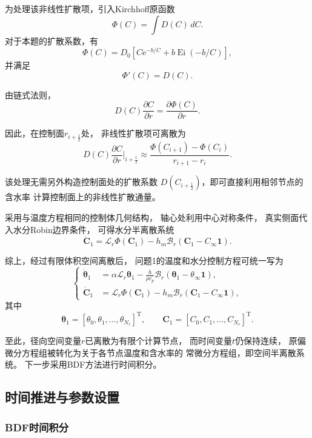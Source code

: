 \documentclass[withoutpreface]{cumcmthesis}
\begin{document}
\begin{enumerate}[label=(\arabic*)]
为处理该非线性扩散项，引入Kirchhoff原函数
\[
\Phi(C)
=
\int D(C)\,dC.
\]
对于本题的扩散系数，有
\[
\Phi(C)
=
D_0
\left[
C\mathrm e^{-b/C}
+
b\operatorname{Ei}(-b/C)
\right],
\]
并满足
\[
\Phi'(C)=D(C).
\]

由链式法则，
\[
D(C)\frac{\partial C}{\partial r}
=
\frac{\partial\Phi(C)}{\partial r}.
\]

因此，在控制面$r_{i+\frac12}$处，
非线性扩散项可离散为
\[
D(C)\frac{\partial C}{\partial r}
\bigg|_{i+\frac12}
\approx
\frac{
\Phi(C_{i+1})-\Phi(C_i)
}{
r_{i+1}-r_i
}.
\]

该处理无需另外构造控制面处的扩散系数
$D(C_{i+\frac12})$，即可直接利用相邻节点的含水率
计算控制面上的非线性扩散通量。

采用与温度方程相同的控制体几何结构，
轴心处利用中心对称条件，
真实侧面代入水分Robin边界条件，
可得水分半离散系统
\[
\dot{\boldsymbol C}_1
=
\mathcal L_r\Phi(\boldsymbol C_1)
-
h_m\mathcal B_r
\left(
\boldsymbol C_1
-
C_\infty\boldsymbol 1
\right).
\]

\end{enumerate}

综上，经过有限体积空间离散后，
问题1的温度和水分控制方程可统一写为
\begin{equation}
\left\{
\begin{aligned}
\dot{\boldsymbol\theta}_1
&=
\alpha\mathcal L_r\boldsymbol\theta_1
-
\frac{h}{\rho c_p}
\mathcal B_r
\left(
\boldsymbol\theta_1
-
\theta_\infty\boldsymbol 1
\right),
\\[1ex]
\dot{\boldsymbol C}_1
&=
\mathcal L_r\Phi(\boldsymbol C_1)
-
h_m\mathcal B_r
\left(
\boldsymbol C_1
-
C_\infty\boldsymbol 1
\right),
\end{aligned}
\right.
\label{eq:ode1}
\end{equation}
其中
\[
\boldsymbol\theta_1
=
[\theta_0,\theta_1,\ldots,\theta_{N_r}]^{\mathrm T},
\qquad
\boldsymbol C_1
=
[C_0,C_1,\ldots,C_{N_r}]^{\mathrm T}.
\]

至此，径向空间变量$r$已离散为有限个计算节点，
而时间变量$t$仍保持连续，
原偏微分方程组被转化为关于各节点温度和含水率的
常微分方程组，即空间半离散系统。
下一步采用BDF方法进行时间积分。
\subsection{时间推进与参数设置}

\subsubsection{BDF时间积分}
\end{document}
